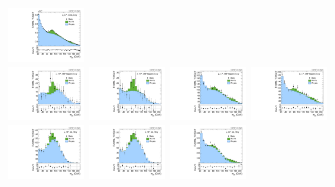 \begin{figure}[htbp]
  \includegraphics[width=0.18\textwidth]{fig/analysisAppendix/PostFit_SR_MJJ__e_LP_nobb_LDy_Run2.pdf}\\
  \includegraphics[width=0.18\textwidth]{fig/analysisAppendix/PostFit_SR_MJJ__mu_HP_vbf_LDy_Run2.pdf}
  \includegraphics[width=0.18\textwidth]{fig/analysisAppendix/PostFit_SR_MJJ__e_HP_vbf_LDy_Run2.pdf}
  \includegraphics[width=0.18\textwidth]{fig/analysisAppendix/PostFit_SR_MJJ__mu_LP_vbf_LDy_Run2.pdf}
  \includegraphics[width=0.18\textwidth]{fig/analysisAppendix/PostFit_SR_MJJ__e_LP_vbf_LDy_Run2.pdf}\\
  \includegraphics[width=0.18\textwidth]{fig/analysisAppendix/PostFit_SR_MJJ__mu_HP_bb_HDy_Run2.pdf}
  \includegraphics[width=0.18\textwidth]{fig/analysisAppendix/PostFit_SR_MJJ__e_HP_bb_HDy_Run2.pdf}
  \includegraphics[width=0.18\textwidth]{fig/analysisAppendix/PostFit_SR_MJJ__mu_LP_bb_HDy_Run2.pdf}

\end{figure}
